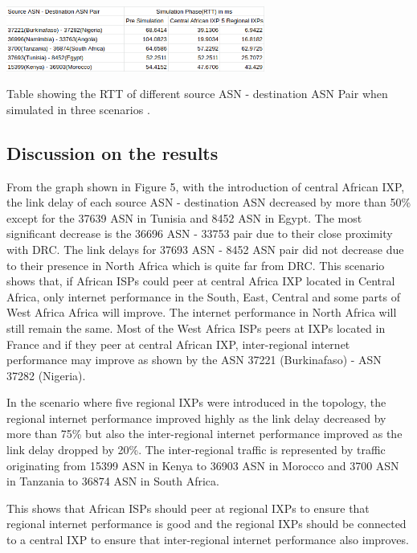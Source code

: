  \begin{table}[htp]
   \centering
     \includegraphics[width=8.5cm]{sections/pictures-diagrams/rttfigures.png}
   \caption{Table showing the RTT of different source ASN - destination ASN Pair when simulated in three scenarios .}
    \label{figure:galaxy}
\end{table}

\subsection{Discussion on the results}
From the graph shown in Figure 5, with the introduction of central African IXP, the link delay of each source ASN - destination ASN decreased by more than 50\% except for the 37639 ASN in Tunisia and 8452 ASN in Egypt. The most significant decrease is the 36696 ASN - 33753 pair due to their close proximity with DRC. The link delays for 37693 ASN - 8452 ASN pair did not decrease due to their presence in North Africa which is quite far from DRC. This scenario shows that, if African ISPs could peer at central Africa IXP located in Central Africa, only internet performance in the South, East, Central and some parts of West Africa Africa will improve. The internet performance in North Africa will still remain the same. Most of the West Africa ISPs peers at IXPs located in France and if they peer at central African IXP, inter-regional internet performance may improve as shown by the ASN 37221 (Burkinafaso) - ASN 37282 (Nigeria).

In the scenario where five regional IXPs were introduced in the topology, the regional internet performance improved highly as the link delay decreased by more than 75\% but also the inter-regional internet performance improved as the link delay dropped by 20\%. The inter-regional traffic is represented by traffic originating from 15399 ASN in Kenya to 36903 ASN in Morocco and 3700 ASN in Tanzania to 36874 ASN in South Africa.

This shows that African ISPs should peer at regional IXPs to ensure that regional internet performance is good and the regional IXPs should be connected to a central IXP to ensure that inter-regional internet performance also improves.  
